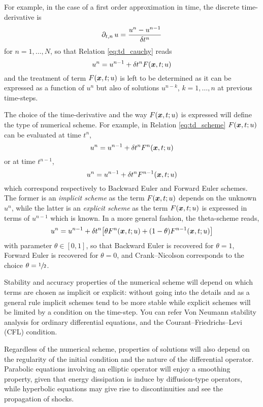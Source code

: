 \medskip
For example, in the case of a first order approximation in time, the discrete time-derivative is
\begin{equation}
\partial_{t,n}\, u = \dfrac{u^{n} - u^{n-1}}{\delta \hspace{-0.05ex} t^n}
\end{equation}
for $n = 1,\dots,N$, so that Relation \eqref{eq:td_cauchy} reads
\begin{equation}\label{eq:td_scheme}
u^n = u^{n-1} + \delta \hspace{-0.05ex} t^n F({{\boldsymbol x}},t; u)
\end{equation}
and the treatment of term $F({{\boldsymbol x}},t; u)$ is left to be determined as it can be expressed as a function of $u^n$ but also of solutions $u^{n-k}$, $k = 1,\dots, n$ at previous time-steps.

\medskip
The choice of the time-derivative and the way $F({{\boldsymbol x}},t; u)$ is expressed will define the type of numerical scheme.
For example, in Relation \eqref{eq:td_scheme} $F({{\boldsymbol x}},t; u)$ can be evaluated at time $t^n$,
\begin{equation}\label{eq:td_implicit}
u^n = u^{n-1} + \delta \hspace{-0.05ex} t^n F^n({{\boldsymbol x}},t; u)
\end{equation}
or at time $t^{n-1}$,
\begin{equation}\label{eq:td_implicit}
u^n = u^{n-1} + \delta \hspace{-0.05ex} t^n F^{n-1}({{\boldsymbol x}},t; u)
\end{equation}
which correspond respectively to Backward Euler and Forward Euler schemes.
The former is an \textit{implicit scheme} as the term $F({{\boldsymbol x}},t; u)$ depends on the unknown $u^n$, while the latter is an \textit{explicit scheme} as the term $F({{\boldsymbol x}},t; u)$ is expressed in terms of $u^{n-1}$ which is known.
In a more general fashion, the theta-scheme reads,
\begin{equation}\label{eq:td_implicit}
u^n = u^{n-1} + \delta \hspace{-0.05ex} t^n \bigl[\theta F^n({{\boldsymbol x}},t; u) + (1-\theta)F^{n-1}({{\boldsymbol x}},t; u)\bigr]
\end{equation}
with parameter $\theta \in [0,1]$, so that Backward Euler is recovered for $\theta = 1$, Forward Euler is recovered for $\theta = 0$, and Crank--Nicolson corresponds to the choice $\theta = \sfrac{1}{2}$.

\medskip
Stability and accuracy properties of the numerical scheme will depend on which terms are chosen as implicit or explicit: without going into the details and as a general rule implicit schemes tend to be more stable while explicit schemes will be limited by a condition on the time-step.
You can refer Von Neumann stability analysis for ordinary differential equations, and the Courant--Friedrichs--Levi (CFL) condition.

\medskip
Regardless of the numerical scheme, properties of solutions will also depend on the regularity of the initial condition and the nature of the differential operator.
Parabolic equations involving an elliptic operator will enjoy a smoothing property, given that energy dissipation is induce by diffusion-type operators, while hyperbolic equations may give rise to discontinuities and see the propagation of shocks.


